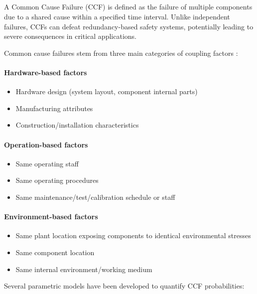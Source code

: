 \subsection{\color{green}{Common-Cause Failures}}

A Common Cause Failure (CCF) is defined as the failure of multiple components due to a shared cause within a specified time interval. Unlike independent failures, CCFs can defeat redundancy-based safety systems, potentially leading to severe consequences in critical applications.

Common cause failures stem from three main categories of coupling factors \cite{NUREG5485}:

\paragraph{Hardware-based factors}
\begin{itemize}
    \item Hardware design (system layout, component internal parts)
    \item Manufacturing attributes
    \item Construction/installation characteristics
\end{itemize}

\paragraph{Operation-based factors}
\begin{itemize}
    \item Same operating staff
    \item Same operating procedures
    \item Same maintenance/test/calibration schedule or staff
\end{itemize}

\paragraph{Environment-based factors}
\begin{itemize}
    \item Same plant location exposing components to identical environmental stresses
    \item Same component location
    \item Same internal environment/working medium
\end{itemize}

Several parametric models have been developed to quantify CCF probabilities:

